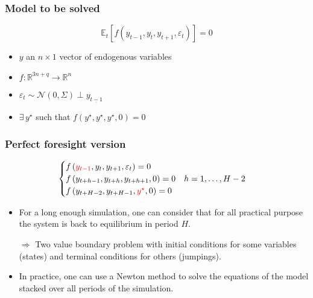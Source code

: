 \documentclass{beamer}
\begin{document}
\begin{frame}
   \frametitle{Model to be solved}

   \[
      \mathbb E_t\left[ f\left( y_{t-1},y_t,y_{t+1},\varepsilon_t \right) \right] = 0
   \]

   \bigskip

   \begin{itemize}

      \item $y$ an $n\times 1$ vector of endogenous variables\newline

      \item $f: \mathbb R^{3n+q}\rightarrow \mathbb R^n$\newline

      \item $\varepsilon_t \sim \mathcal N\left( 0,\Sigma \right) \perp y_{\underline{t-1}}$\newline

      \item $ \exists\, y^{\star}$ such that $f\left( y^{\star},y^{\star},y^{\star},0 \right)=0$

   \end{itemize}

\end{frame}


\begin{frame}
   \frametitle{Perfect foresight version}

   \[
      \begin{cases}
         f\left( {\color{red}y_{t-1}},y_t,y_{t+1},\varepsilon_t \right) = 0     \\
         f\left( y_{t+h-1},y_{t+h},y_{t+h+1}, 0 \right) = 0\quad h=1,\ldots,H-2 \\
         f\left( y_{t+H-2},y_{t+H-1},{\color{red}y^{\star}}, 0 \right) = 0      \\
      \end{cases}
   \]
   \bigskip

   \begin{itemize}

      \item For a long enough simulation, one can consider that for all
            practical purpose the system is back to equilibrium in period $H$.\newline

      \item[$\Rightarrow$] Two value boundary problem with
            initial conditions for some variables (states) and
            terminal conditions for others (jumpings).\newline

      \item In practice, one can use a Newton method to solve the equations of
            the model stacked over all periods of the simulation.\newline

   \end{itemize}

\end{frame}
\end{document}
